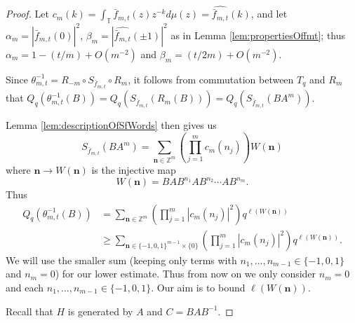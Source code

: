 \documentclass[10pt,a4paper]{amsart}
\begin{document}
\begin{proof}
Let $\ensuremath{c_{m}(k)=\int_{\mathbb{T}}\bar{f}_{m,t}(z)z^{-k}d\mu(z)=\widehat{\bar{f}_{m,t}}(k)}$,
and let $\alpha_{m}=\left|\widehat{\bar{f}_{m,t}}(0)\right|^{2}$,
$\beta_{m}=\left|\widehat{\bar{f}_{m,t}}(\pm1)\right|^{2}$ as in
Lemma \ref{lem:propertiesOffmt}; thus $\alpha_{m}=1-(t/m)+O(m^{-2})$
and $\beta_{m}=(t/2m)+O(m^{-2})$. 

Since $\theta_{m,t}^{-1}=R_{-m}\circ S_{\bar{f}_{m,t}}\circ R_{m}$,
it follows from commutation between $T_{q}$ and $R_{m}$ that $Q_{q}(\theta_{m,t}^{-1}(B))=Q_{q}(S_{\bar{f}_{m,t}}(R_{m}(B)))=Q_{q}(S_{\bar{f}_{m,t}}(BA^{m}))$.

Lemma \ref{lem:descriptionOfSfWords} then gives us
\[
S_{\bar{f}_{m,t}}(BA^{m})=\sum_{\mathbf{n}\in\mathbb{Z}^{m}}\left(\prod_{j=1}^{m}c_{m}(n_{j})\right)W(\mathbf{n})
\]
where $\mathbf{n}\to W(\mathbf{n})$ is the injective map
\[
W(\mathbf{n})=BAB^{n_{1}}AB^{n_{2}}\cdots AB^{n_{m}}.
\]
Thus
\begin{align}
Q_{q}(\theta_{m,t}^{-1}(B)) & =\sum_{\mathbf{n}\in\mathbb{Z}^{m}}\left(\prod_{j=1}^{m}|c_{m}(n_{j})|^{2}\right)q^{\ell(W(\mathbf{n}))}\nonumber \\
 & \geq\sum_{\mathbf{n}\in\{-1,0,1\}^{m-1}\times\{0\}}\left(\prod_{j=1}^{m}|c_{m}(n_{j})|^{2}\right)q^{\ell(W(\mathbf{n}))}.\label{eq:termsWeKeep}
\end{align}
We will use the smaller sum (keeping only terms with $n_{1},\dots,n_{m-1}\in\{-1,0,1\}$
and $n_{m}=0$) for our lower estimate. Thus from now on we only consider
$n_{m}=0$ and each $n_{1},\dots,n_{m-1}\in\{-1,0,1\}$. Our aim is
to bound $\ell(W(\mathbf{n})).$

Recall that $H$ is generated by $A$ and $C=BAB^{-1}$. 


\end{proof}
\end{document}
